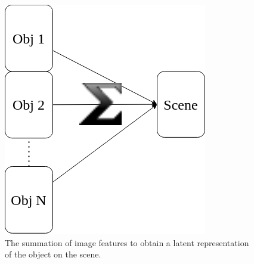 \documentclass{article}
\begin{document}
\begin{figure}[ht]{\linewidth}
\begin{minipage}[b]{0.48\textwidth}
            \centering
            \includegraphics[width=\textwidth]{img/model/sum_objects_to_scene}
            \caption{The summation of image features to obtain a latent representation of the object on the scene.}
            \label{fig:sum_objects_to_scene}
        \end{minipage}\hfill
        \begin{minipage}[b]{0.48\textwidth}
            \centering

\end{minipage}
\end{figure}
\end{document}

